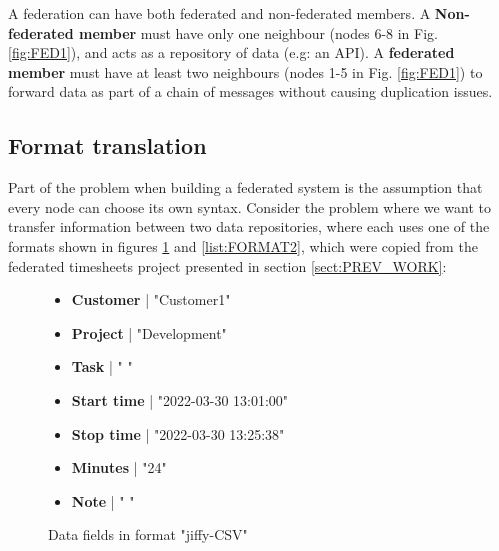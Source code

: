 \documentclass[journal]{IEEEtran}
\begin{document}
A federation can have both federated and non-federated members. A \textbf {Non-federated member} must have only one neighbour (nodes 6-8 in Fig. \ref{fig:FED1}), and acts as a repository of data (e.g: an API). A \textbf{federated member} must have at least two neighbours (nodes 1-5 in Fig. \ref{fig:FED1}) to forward data as part of a chain of messages without causing duplication issues.

\subsection{Format translation} \label{sect:FORMAT_TRANSLATION}

Part of the problem when building a federated system is the assumption that every node can choose its own syntax. Consider the problem where we want to transfer information between two data repositories, where each uses one of the formats shown in figures \ref{list:FORMAT1} and \ref{list:FORMAT2}, which were copied from the federated timesheets project presented in section \ref{sect:PREV_WORK}:

\begin{figure}[h]

	\begin{itemize}
	
		\item \textbf{Customer} | "Customer1"

		\item \textbf{Project} | "Development"

		\item \textbf{Task} | " "

		\item \textbf{Start time} | "2022-03-30 13:01:00"

		\item \textbf{Stop time} | "2022-03-30 13:25:38"

		\item \textbf{Minutes} | "24"

		\item \textbf{Note} | " "

	\end{itemize}
	\caption{Data fields in format "jiffy-CSV"}
	\label{list:FORMAT1}

\end{figure}
\end{document}
